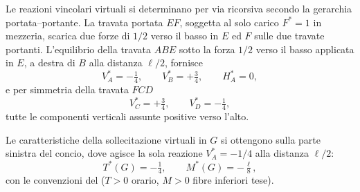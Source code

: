 \begin{esempio}
\begin{svolgimento}
		Le reazioni vincolari virtuali si determinano per via ricorsiva 
		secondo la gerarchia portata--portante. La travata portata $EF$, 
		soggetta al solo carico $F^{*}=1$ in mezzeria, scarica due forze 
		di $1/2$ verso il basso in $E$ ed $F$ sulle due travate portanti. 
		L'equilibrio della travata $ABE$ sotto la forza $1/2$ verso il basso 
		applicata in $E$, a destra di $B$ alla distanza $\ell/2$, fornisce
		\begin{equation*}
			V_A^{*} = -\tfrac{1}{4}, \qquad V_B^{*} = +\tfrac{3}{4}, 
			\qquad H_A^{*} = 0,
		\end{equation*}
		e per simmetria della travata $FCD$
		\begin{equation*}
			V_C^{*} = +\tfrac{3}{4}, \qquad V_D^{*} = -\tfrac{1}{4},
		\end{equation*}
		tutte le componenti verticali assunte positive verso l'alto.
		
		Le caratteristiche della sollecitazione virtuali in $G$ si ottengono 
		sulla parte sinistra del concio, dove agisce la sola reazione 
		$V_A^{*}=-1/4$ alla distanza $\ell/2$:
		\begin{equation*}
			T^{*}(G) = -\tfrac{1}{4}, \qquad 
			M^{*}(G) = -\tfrac{\ell}{8},
		\end{equation*}
		con le convenzioni del  
		($T>0$ orario, $M>0$ fibre inferiori tese).
		



		

\end{svolgimento}
\end{esempio}
